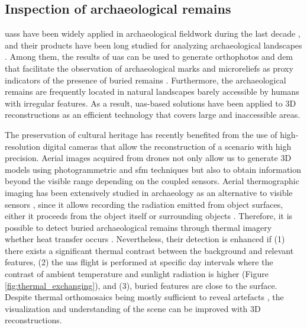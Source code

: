 \subsection{Inspection of archaeological remains}

\acrshort{uas}s have been widely applied in archaeological fieldwork during the last decade \cite{campana_drones_2017}, and their products have been long studied for analyzing archaeological landscapes \cite{waagen_new_2019}. Among them, the results of \acrshort{uas} can be used to generate orthophotos and \acrshort{dem} that facilitate the observation of archaeological marks and microreliefs as proxy indicators of the presence of buried remains \cite{pecci_archaeology_2016, dubbini_digital_2016}. Furthermore, the archaeological remains are frequently located in natural landscapes barely accessible by humans with irregular features. As a result, \acrshort{uas}-based solutions have been applied to 3D reconstructions as an efficient technology that covers large and inaccessible areas. 

The preservation of cultural heritage has recently benefited from the use of high-resolution digital cameras that allow the reconstruction of a scenario with high precision. Aerial images acquired from drones not only allow us to generate 3D models using photogrammetric and \acrshort{sfm} techniques but also to obtain information beyond the visible range depending on the coupled sensors. Aerial thermographic imaging has been extensively studied in archaeology as an alternative to visible sensors \cite{casana_archaeological_2017, brooke_thermal_2018, mcleester_detecting_2018, salgado_carmona_assessing_2020}, since it allows recording the radiation emitted from object surfaces, either it proceeds from the object itself or surrounding objects \cite{vollmer_infrared_2017}. Therefore, it is possible to detect buried archaeological remains through thermal imagery whether heat transfer occurs \cite{casana_archaeological_2017}. Nevertheless, their detection is enhanced if (1) there exists a significant thermal contrast between the background and relevant features, (2) the \acrshort{uas} flight is performed at specific day intervals where the contrast of ambient temperature and sunlight radiation is higher (Figure \ref{fig:thermal_exchanging}), and (3), buried features are close to the surface. Despite thermal orthomosaics being mostly sufficient to reveal artefacts \cite{mcleester_detecting_2018, salgado_carmona_assessing_2020}, the visualization and understanding of the scene can be improved with 3D reconstructions. 

